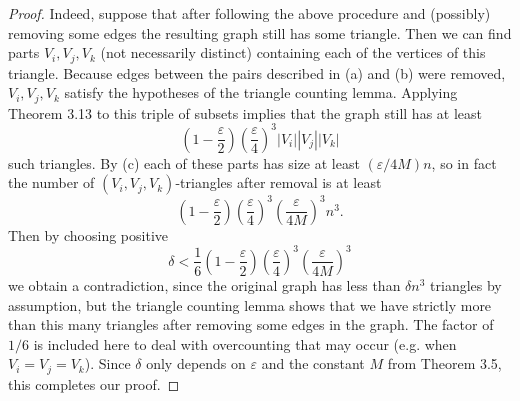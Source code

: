 \begin{proof}
Indeed, suppose that after following the above procedure and (possibly) removing some edges the resulting graph still has some triangle. Then we can find parts $V_i,V_j,V_k$ (not necessarily distinct) containing each of the vertices of this triangle. Because edges between the pairs described in (a) and (b) were removed, $V_i,V_j,V_k$ satisfy the hypotheses of the triangle counting lemma. Applying Theorem 3.13 to this triple of subsets implies that the graph still has at least
\[\left(1-\frac{\varepsilon}{2}\right)\left(\frac{\varepsilon}{4}\right)^3|V_i||V_j||V_k|\]
such triangles. By (c) each of these parts has size at least $(\varepsilon/4M)n$, so in fact the number of $(V_i,V_j,V_k)$-triangles after removal is at least
\[\left(1-\frac{\varepsilon}{2}\right)\left(\frac{\varepsilon}{4}\right)^3\left(\frac{\varepsilon}{4M}\right)^3n^3.\]
Then by choosing positive
\[\delta<\frac16\left(1-\frac{\varepsilon}{2}\right)\left(\frac{\varepsilon}{4}\right)^3\left(\frac{\varepsilon}{4M}\right)^3\]
we obtain a contradiction, since the original graph has less than $\delta n^3$ triangles by assumption, but the triangle counting lemma shows that we have strictly more than this many triangles after removing some edges in the graph. The factor of $1/6$ is included here to deal with overcounting that may occur (e.g. when $V_i=V_j=V_k$). Since $\delta$ only depends on $\varepsilon$ and the constant $M$ from Theorem 3.5, this completes our proof.
\end{proof}
